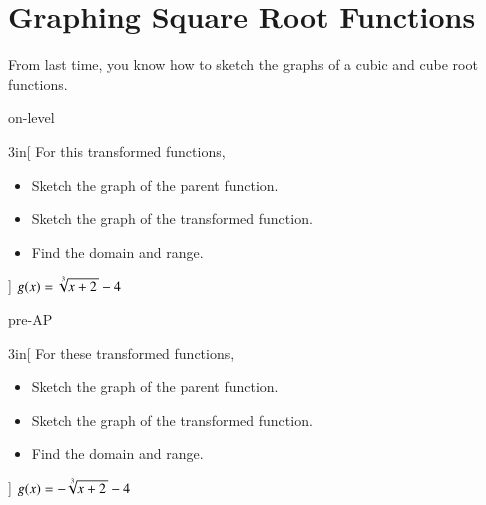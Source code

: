 \section{Graphing Square Root Functions}

From last time,
you know how to sketch the graphs 
of a  cubic and cube root functions.


\begin{taggedblock}{on-level}
    \begin{myProblem}{3in}[
        For this transformed functions,
        \vspace{-0.75\baselineskip}
        \small
        \begin{itemize}[nosep]
            \item Sketch the graph of the parent function.
            \item Sketch the graph of the transformed function.
            \item Find the domain and range.
        \end{itemize}
        ]
        {
            $g(x) = \myRoot[3]{x+2} - 4$
        }
    \end{myProblem}
\end{taggedblock}

\begin{taggedblock}{pre-AP}
    \begin{myProblem}{3in}[
        For these transformed functions,
        \vspace{-0.75\baselineskip}
        \small
        \begin{itemize}[nosep]
            \item Sketch the graph of the parent function.
            \item Sketch the graph of the transformed function.
            \item Find the domain and range.
        \end{itemize}
        ]
        {
            $g(x) = -\myRoot[3]{x+2} - 4$
        }
    \end{myProblem}
\end{taggedblock}

